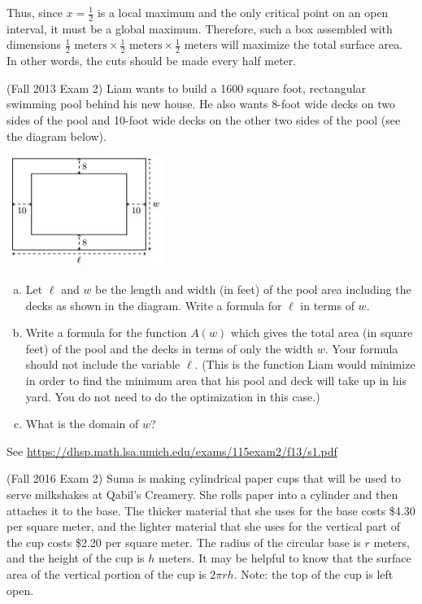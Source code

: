 \documentclass[11pt]{exam}
\begin{document}
\begin{questions}
\begin{solution}
    Thus, since \(x = \frac{1}{2}\) is a local maximum and the only
    critical point on an open interval, it must be a global
    maximum. Therefore, such a box assembled with dimensions
    \(\frac{1}{2} \text{ meters} \times \frac{1}{2} \text{ meters}
    \times \frac{1}{2} \text{ meters}\) will maximize the total
    surface area. In other words, the cuts should be made every half meter.
\end{solution}
\pagebreak
\question (Fall 2013 Exam 2) %
Liam wants to build a 1600 square foot, rectangular swimming pool behind his new house. He also wants 8-foot wide decks on two sides of the pool
and 10-foot wide decks on the other two sides of the pool (see the diagram below).
\begin{center}
	\includegraphics[width=2in]{pool.jpg}
\end{center}

\begin{enumerate}[(a)]
	
	\item  Let $\ell$ and $w$ be the length and width (in feet) of the pool area including the
	decks as shown in the diagram. Write a formula for $\ell$ in terms of $w$.
	
	
	\item  Write a formula for the function $A(w)$ which gives the total area (in square
	feet) of the pool and the decks in terms of only the width $w$. Your formula should not
	include the variable $\ell$.   (This is the function Liam would minimize in order to find the
	minimum area that his pool and deck will take up in his yard. You do not need to do the
	optimization in this case.)
	
	
	\item  What is the domain of $w$?
	
\end{enumerate}
\begin{solution}
  See \href{https://dhsp.math.lsa.umich.edu/exams/115exam2/f13/s1.pdf}{https://dhsp.math.lsa.umich.edu/exams/115exam2/f13/s1.pdf}
\end{solution}
\vspace{0.75in}
\question (Fall 2016 Exam 2) %
	Suma is making cylindrical paper cups that will be used to serve milkshakes at Qabil’s Creamery. She rolls paper into a cylinder and then attaches it to the base. The thicker material that she uses for the base costs \$4.30 per square meter, and the lighter material that she uses for the vertical part of the cup costs \$2.20 per square meter. The radius of the circular base is $r$ meters, and the height of the cup is $h$ meters.
	It may be helpful to know that the surface area of the vertical portion of the cup is $2 \pi r h$.
Note: the top of the cup is left open.


\end{questions}
\end{document}
